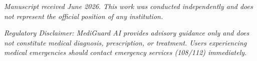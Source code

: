 \documentclass[conference]{IEEEtran}
\begin{document}
\vspace{6pt}

\noindent\textit{Manuscript received June 2026. This work was conducted independently and does not represent the official position of any institution.}

\noindent\textit{Regulatory Disclaimer: MediGuard AI provides advisory guidance only and does not constitute medical diagnosis, prescription, or treatment. Users experiencing medical emergencies should contact emergency services (108/112) immediately.}
\end{document}
